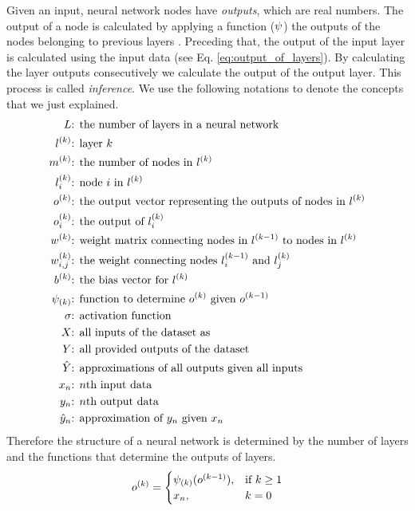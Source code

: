 Given an input, neural network nodes have \textit{outputs}, which are real numbers. The output of a node is calculated by applying a function ($\psi$) the outputs of the nodes belonging to previous layers . Preceding that, the output of the input layer is calculated using the input data (see Eq. \ref{eq:output_of_layers}).  By calculating the layer outputs consecutively we calculate the output of the output layer. This process is called \textit{inference}. We use the following notations to denote the concepts that we just explained.
\begin{equation}
\label{eq:variable_definitions}
\begin{split}
\num\layer & \text{: the number of layers in a neural network}\\
\lk{k} & \text{: layer $k$}\\
\mk{k} & \text{: the number of nodes in $\lk{k}$}\\
\lki{k}{i}  & \text{: node $i$ in $\lk{k}$}\\
\ok{k}  & \text{: the output vector representing the outputs of nodes in $\lk{k}$}\\
\oki{k}{i}  & \text{: the output of $\lki{k}{i}$}\\
\wk{k}  & \text{: weight matrix connecting nodes in $\lk{k-1}$ to nodes in $\lk{k}$} \\
\wki{k}{i,j}  & \text{: the weight connecting nodes $\lki{k-1}{i}$ and $\lki{k}{j}$} \\
\bk{k}  & \text{: the bias vector for $\lk{k}$} \\
\lfk{k} & \text{: function to determine $\ok{k}$ given $\ok{k-1}$}\\
\act & \text{: activation function} \\
\all\x & \text{: all inputs of the dataset as}\\
\all\y & \text{: all provided outputs of the dataset} \\
\all\yh & \text{: approximations of all outputs given all inputs}  \\
\xn{n} & \text{: $n$th input data} \\
\yn{n} & \text{: $n$th output data} \\
\yhn{n} & \text{: approximation of $\yn{n}$ given $\xn{n}$}
\end{split}
\end{equation}
Therefore the structure of a neural network is determined by the number of layers and the functions that determine the outputs of layers.
\begin{equation}
\label{eq:output_of_layers}
    o^{(k)} = 
\begin{cases}
    \psi_{(k)}(o^{(k-1)}), &\text{if } k\geq 1\\
    x_{n},& k = 0\\
\end{cases}
\end{equation}

